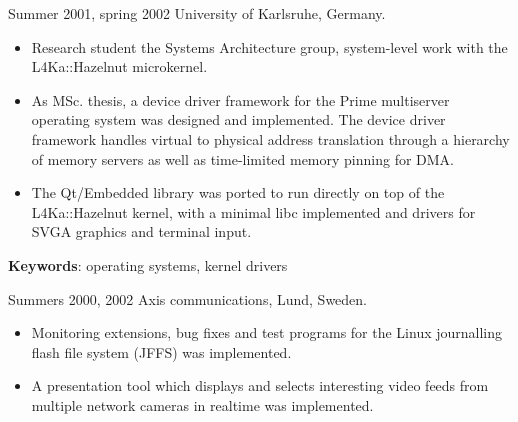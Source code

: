 \documentclass[a4paper]{article}
\begin{document}
\begin{CV}
\item[Summer 2001, spring 2002] University of Karlsruhe, Germany.
  \begin{itemize}
  \item Research student the Systems Architecture group, system-level work
    with the L4Ka::Hazelnut microkernel.
  \item As MSc. thesis, a device driver framework for the Prime multiserver
    operating system was designed and implemented. The device driver framework
    handles virtual to physical address translation through a hierarchy of
    memory servers as well as time-limited memory pinning for DMA.
  \item The Qt/Embedded library was ported to run directly on top of the
    L4Ka::Hazelnut kernel, with a minimal libc implemented and drivers for
    SVGA graphics and terminal input.
  \end{itemize}

\textbf{Keywords}: operating systems, kernel drivers


\item[Summers 2000, 2002] Axis communications, Lund, Sweden.
  \begin{itemize}
  \item Monitoring extensions, bug fixes and test programs for the Linux journalling
    flash file system (JFFS) was implemented.
  \item A presentation tool which displays and selects interesting video feeds
    from multiple network cameras in realtime was implemented.
  \end{itemize}

\end{CV}
%




\nocite{kagstrom08phd, kagstrom05experiences, kagstrom05appkern,
  kagstrom07cibyl}
\noindent
\end{document}
